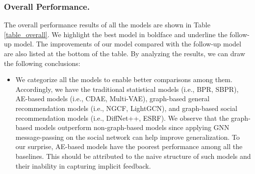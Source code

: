 \documentclass[letterpaper]{article} %
\begin{document}
\subsubsection{Overall Performance.}
The overall performance results of all the models are shown in Table \ref{table_overall}. We highlight the best model in boldface and underline the follow-up model. The improvements of our model compared with the follow-up model are also listed at the bottom of the table. By analyzing the results, we can draw the following conclusions:
\begin{itemize}
    \item We categorize all the models to enable better comparisons among them. Accordingly, we have the traditional statistical models (i.e., BPR, SBPR), AE-based models (i.e., CDAE, Multi-VAE), graph-based general recommendation models (i.e., NGCF, LightGCN), and graph-based social recommendation models (i.e., DiffNet++, ESRF). We observe that the graph-based models outperform non-graph-based models since applying GNN message-passing on the social network can help improve generalization. To our surprise, AE-based models have the poorest performance among all the baselines. This should be attributed to the naive structure of such models and their inability in capturing implicit feedback.

\end{itemize}
\end{document}
